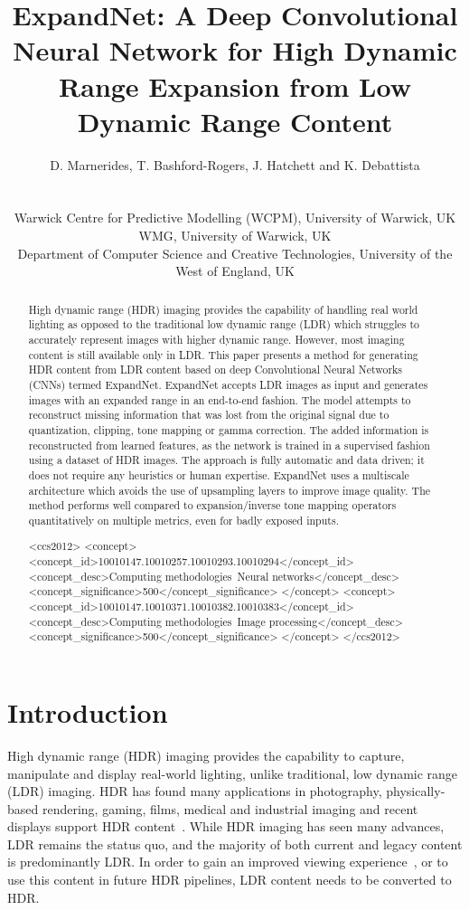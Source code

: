 \documentclass{egpubl}
\title[ExpandNet]{ExpandNet: A Deep Convolutional Neural Network for High Dynamic Range Expansion from Low Dynamic Range Content}
\author[Marnerides et al.]
{\parbox{\textwidth}{\centering D. Marnerides,
T. Bashford-Rogers,
J. Hatchett
and K. Debattista
        }
        \\
{\parbox{\textwidth}{\centering Warwick Centre for Predictive Modelling (WCPM), University of Warwick, UK\\
          WMG, University of Warwick, UK\\
          Department of Computer Science and Creative Technologies, University of the West of England, UK
       }
}
}
\begin{document}
\maketitle
\begin{abstract}
    High dynamic range (HDR) imaging provides the capability of handling real world
    lighting as opposed to the traditional low dynamic range (LDR) which struggles
    to accurately represent images with higher dynamic range. However, most imaging
    content is still available only in LDR. This paper presents a method for
    generating HDR content from LDR content based on deep Convolutional Neural
    Networks (CNNs) termed ExpandNet. ExpandNet accepts LDR images as input and
    generates images with an expanded range in an end-to-end fashion. The model
    attempts to reconstruct missing information that was lost from the original
    signal due to quantization, clipping, tone mapping or gamma correction. The
    added information is reconstructed from learned features, as the network is
    trained in a supervised fashion using a dataset of HDR images. The approach is
    fully automatic and data driven; it does not require any heuristics or human
    expertise. ExpandNet uses a multiscale architecture which avoids the use of
    upsampling layers to improve image quality. The method performs well compared to
    expansion/inverse tone mapping operators quantitatively on multiple
    metrics, even for badly exposed inputs.


\begin{CCSXML}
<ccs2012>
<concept>
<concept_id>10010147.10010257.10010293.10010294</concept_id>
<concept_desc>Computing methodologies~Neural networks</concept_desc>
<concept_significance>500</concept_significance>
</concept>
<concept>
<concept_id>10010147.10010371.10010382.10010383</concept_id>
<concept_desc>Computing methodologies~Image processing</concept_desc>
<concept_significance>500</concept_significance>
</concept>
</ccs2012>
\end{CCSXML}


\printccsdesc
\end{abstract}


\section{\textbf{Introduction}}

High dynamic range (HDR) imaging provides the capability to capture, manipulate and display real-world lighting, unlike traditional, low dynamic
range (LDR) imaging. HDR has found many applications in photography, physically-based rendering, gaming, films, medical and industrial imaging and
recent displays support HDR content~\cite{eetzen2004hdr, marchessoux2016medicalhdr}. While HDR imaging has seen many advances, LDR remains the status
quo, and the majority of both current and legacy content is predominantly LDR. In order to gain an improved viewing experience~\cite{akyuz06}, or to
use this content in future HDR pipelines, LDR content needs to be converted to HDR.
\end{document}
